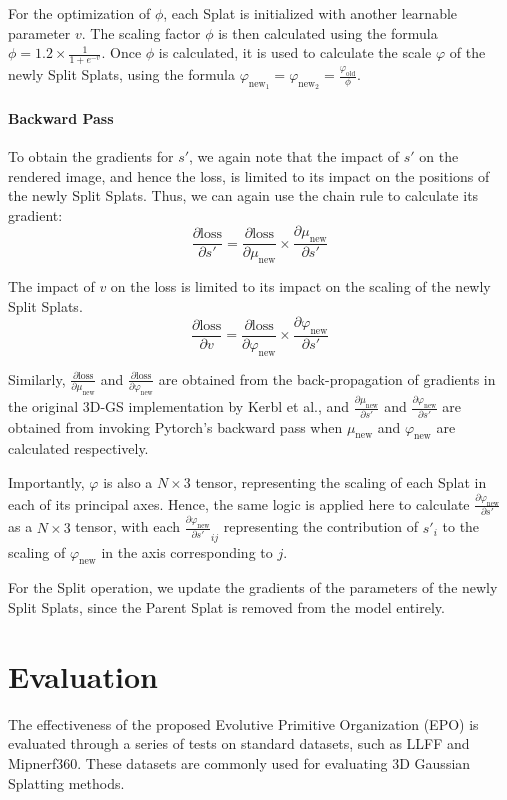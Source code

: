 \documentclass[11pt]{report}
\begin{document}
For the optimization of $\phi$, each Splat is initialized with another learnable parameter $v$. The scaling factor $\phi$ is then calculated using the formula $\phi = 1.2 \times \frac{1}{1 + e^{-v}}$. Once $\phi$ is calculated, it is used to calculate the scale $\varphi$ of the newly Split Splats, using the formula $\varphi_{\text{new}_1} =  \varphi_{\text{new}_2} = \frac{\varphi_{\text{old}}}{\phi}$.

\subsubsection{Backward Pass}
To obtain the gradients for $s'$, we again note that the impact of $s'$ on the rendered image, and hence the loss, is limited to its impact on the positions of the newly Split Splats. Thus, we can again use the chain rule to calculate its gradient:
\[ \frac{\partial \text{loss}}{\partial s'} = \frac{\partial \text{loss}}{\partial \mu_{\text{new}}} \times \frac{\partial \mu_{\text{new}}}{\partial s'} \]

The impact of $v$ on the loss is limited to its impact on the scaling of the newly Split Splats.
\[ \frac{\partial \text{loss}}{\partial v} = \frac{\partial \text{loss}}{\partial \varphi_{\text{new}}} \times \frac{\partial \varphi_{\text{new}}}{\partial s'} \]

Similarly, $\frac{\partial \text{loss}}{\partial \mu_{\text{new}}}$ and $\frac{\partial \text{loss}}{\partial \varphi_{\text{new}}}$ are obtained from the back-propagation of gradients in the original 3D-GS implementation by Kerbl et al., and $\frac{\partial \mu_{\text{new}}}{\partial s'}$ and $\frac{\partial \varphi_{\text{new}}}{\partial s'}$ are obtained from invoking Pytorch's backward pass when $\mu_{\text{new}}$ and $\varphi_{\text{new}}$ are calculated respectively.

Importantly, $\varphi$ is also a $N \times 3$ tensor, representing the scaling of each Splat in each of its principal axes. Hence, the same logic is applied here to calculate $\frac{\partial \varphi_{\text{new}}}{\partial s'}$ as a $N \times 3$ tensor, with each $\frac{\partial \varphi_{\text{new}}}{\partial s'}_{ij}$ representing the contribution of $s'_{i}$ to the scaling of $\varphi_{\text{new}}$ in the axis corresponding to $j$.

For the Split operation, we update the gradients of the parameters of the newly Split Splats, since the Parent Splat is removed from the model entirely.

\chapter{Evaluation}
The effectiveness of the proposed Evolutive Primitive Organization (EPO) is evaluated through a series of tests on standard datasets, such as LLFF and Mipnerf360. These datasets are commonly used for evaluating 3D Gaussian Splatting methods.
\end{document}

